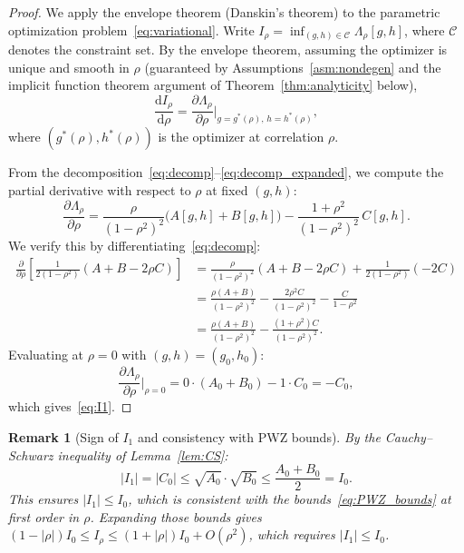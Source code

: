 \documentclass[11pt]{article}
\newtheorem{remark}[theorem]{Remark}
\theoremstyle{definition}
\newcommand{\dd}{\mathrm{d}}
\begin{document}
\begin{proof}
We apply the envelope theorem (Danskin's theorem) to the parametric optimization problem~\eqref{eq:variational}. Write $I_\rho = \inf_{(g,h) \in \mathcal{C}} \Lambda_\rho[g,h]$, where $\mathcal{C}$ denotes the constraint set. By the envelope theorem, assuming the optimizer is unique and smooth in $\rho$ (guaranteed by Assumptions~\ref{asm:nondegen} and the implicit function theorem argument of Theorem~\ref{thm:analyticity} below),
\begin{equation}\label{eq:envelope}
  \frac{\dd I_\rho}{\dd\rho} = \frac{\partial \Lambda_\rho}{\partial\rho}\bigg|_{g = g^*(\rho),\, h = h^*(\rho)},
\end{equation}
where $(g^*(\rho), h^*(\rho))$ is the optimizer at correlation $\rho$.

From the decomposition~\eqref{eq:decomp}--\eqref{eq:decomp_expanded}, we compute the partial derivative with respect to $\rho$ at fixed $(g,h)$:
\begin{equation}\label{eq:dLambda_drho}
  \frac{\partial\Lambda_\rho}{\partial\rho} = \frac{\rho}{(1-\rho^2)^2}\bigl(A[g,h] + B[g,h]\bigr) - \frac{1+\rho^2}{(1-\rho^2)^2}\,C[g,h].
\end{equation}
We verify this by differentiating~\eqref{eq:decomp}:
\begin{align}
  \frac{\partial}{\partial\rho}\left[\frac{1}{2(1-\rho^2)}(A+B-2\rho C)\right]
  &= \frac{\rho}{(1-\rho^2)^2}(A+B-2\rho C) + \frac{1}{2(1-\rho^2)}(-2C) \\
  &= \frac{\rho(A+B)}{(1-\rho^2)^2} - \frac{2\rho^2 C}{(1-\rho^2)^2} - \frac{C}{1-\rho^2} \\
  &= \frac{\rho(A+B)}{(1-\rho^2)^2} - \frac{(1+\rho^2)C}{(1-\rho^2)^2}.
\end{align}
Evaluating at $\rho = 0$ with $(g,h) = (g_0, h_0)$:
\begin{equation}
  \frac{\partial\Lambda_\rho}{\partial\rho}\bigg|_{\rho=0} = 0 \cdot (A_0 + B_0) - 1 \cdot C_0 = -C_0,
\end{equation}
which gives~\eqref{eq:I1}.
\end{proof}

\begin{remark}[Sign of $I_1$ and consistency with PWZ bounds]\label{rem:sign}
By the Cauchy--Schwarz inequality of Lemma~\ref{lem:CS}:
\begin{equation}
  |I_1| = |C_0| \leq \sqrt{A_0}\cdot\sqrt{B_0} \leq \frac{A_0 + B_0}{2} = I_0.
\end{equation}
This ensures $|I_1| \leq I_0$, which is consistent with the bounds~\eqref{eq:PWZ_bounds} at first order in $\rho$. Expanding those bounds gives $(1-|\rho|)I_0 \leq I_\rho \leq (1+|\rho|)I_0 + O(\rho^2)$, which requires $|I_1| \leq I_0$.
\end{remark}
\end{document}

